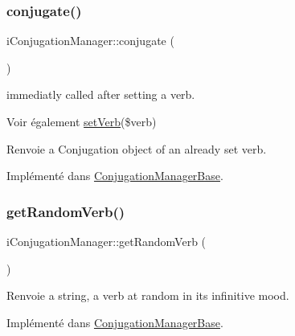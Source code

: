 \subsubsection{\texorpdfstring{conjugate()}{conjugate()}}
{\footnotesize\ttfamily i\+Conjugation\+Manager\+::conjugate (\begin{DoxyParamCaption}{ }\end{DoxyParamCaption})}



immediatly called after setting a verb. 

\begin{DoxySeeAlso}{Voir également}
\hyperlink{interfaceiConjugationManager_a1b56822fc7f5f7b7b9c0b0c406993b3c}{set\+Verb}(\$verb) 
\end{DoxySeeAlso}
\begin{DoxyReturn}{Renvoie}
a Conjugation object of an already set verb. 
\end{DoxyReturn}


Implémenté dans \hyperlink{classConjugationManagerBase_a20e28aa17935e10b1a763b39a3c4fdf3}{Conjugation\+Manager\+Base}.

\hypertarget{interfaceiConjugationManager_a2e955e8c88d45869683005343cbfac60}{}\label{interfaceiConjugationManager_a2e955e8c88d45869683005343cbfac60} 
\subsubsection{\texorpdfstring{get\+Random\+Verb()}{getRandomVerb()}}
{\footnotesize\ttfamily i\+Conjugation\+Manager\+::get\+Random\+Verb (\begin{DoxyParamCaption}{ }\end{DoxyParamCaption})}

\begin{DoxyReturn}{Renvoie}
a string, a verb at random in its infinitive mood. 
\end{DoxyReturn}


Implémenté dans \hyperlink{classConjugationManagerBase_ac2e82ace9b19d7b014908ec275b552bc}{Conjugation\+Manager\+Base}.

\hypertarget{interfaceiConjugationManager_a0273fc00cbbf9e83823d571e3e2c8945}{}\label{interfaceiConjugationManager_a0273fc00cbbf9e83823d571e3e2c8945} 
